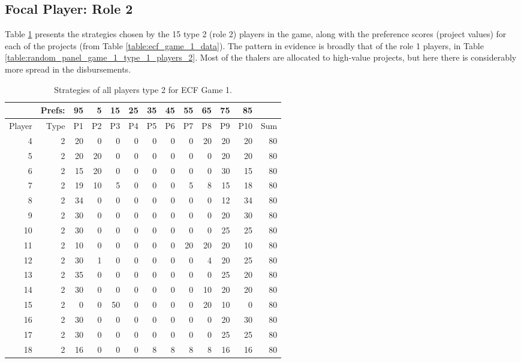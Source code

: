 \documentclass[11pt, oneside]{article}   	%
\begin{document}
\newpage\clearpage

\subsection{Focal Player: Role 2}

Table \ref{table:random_panel_game_1_type_2_players} presents the strategies chosen by the
15 type 2 (role 2) players in the game, along with  the preference scores (project values) for each of the projects (from Table \ref{table:ecf_game_1_data}). The pattern in evidence is broadly that of the role 1 players, in Table \ref{table:random_panel_game_1_type_1_players_2}. Most of the thalers are allocated to high-value projects, but here there is considerably more spread in the disbursements.



 \begin{table}[h]
 \figtop
 
 \centering
\begin{tabular}{rrrrrrrrrrrrr}
 & Prefs: & 95 & 5 & 15 & 25 & 35 & 45 & 55 & 65 & 75 & 85 & \\\hline
Player & Type & P1 & P2 & P3 & P4 & P5 & P6 & P7 & P8 & P9 & P10 & Sum \\ \hline
4 & 2 & 20 & 0 & 0 & 0 & 0 & 0 & 0 & 20 & 20 & 20 & 80 \\ 
5 & 2 & 20 & 20 & 0 & 0 & 0 & 0 & 0 & 0 & 20 & 20 & 80 \\ 
6 & 2 & 15 & 20 & 0 & 0 & 0 & 0 & 0 & 0 & 30 & 15 & 80 \\ 
7 & 2 & 19 & 10 & 5 & 0 & 0 & 0 & 5 & 8 & 15 & 18 & 80 \\ 
8 & 2 & 34 & 0 & 0 & 0 & 0 & 0 & 0 & 0 & 12 & 34 & 80 \\ 
9 & 2 & 30 & 0 & 0 & 0 & 0 & 0 & 0 & 0 & 20 & 30 & 80 \\ 
10 & 2 & 30 & 0 & 0 & 0 & 0 & 0 & 0 & 0 & 25 & 25 & 80 \\ 
11 & 2 & 10 & 0 & 0 & 0 & 0 & 0 & 20 & 20 & 20 & 10 & 80 \\ 
12 & 2 & 30 & 1 & 0 & 0 & 0 & 0 & 0 & 4 & 20 & 25 & 80 \\ 
13 & 2 & 35 & 0 & 0 & 0 & 0 & 0 & 0 & 0 & 25 & 20 & 80 \\ 
14 & 2 & 30 & 0 & 0 & 0 & 0 & 0 & 0 & 10 & 20 & 20 & 80 \\ 
15 & 2 & 0 & 0 & 50 & 0 & 0 & 0 & 0 & 20 & 10 & 0 & 80 \\ 
16 & 2 & 30 & 0 & 0 & 0 & 0 & 0 & 0 & 0 & 20 & 30 & 80 \\ 
17 & 2 & 30 & 0 & 0 & 0 & 0 & 0 & 0 & 0 & 25 & 25 & 80 \\ 
18 & 2 & 16 & 0 & 0 & 0 & 8 & 8 & 8 & 8 & 16 & 16 & 80 \\ 
\end{tabular}
 \caption{Strategies of all players type 2 for ECF Game 1.}
 \label{table:random_panel_game_1_type_2_players}
 \figbot
\end{table}
\end{document}
